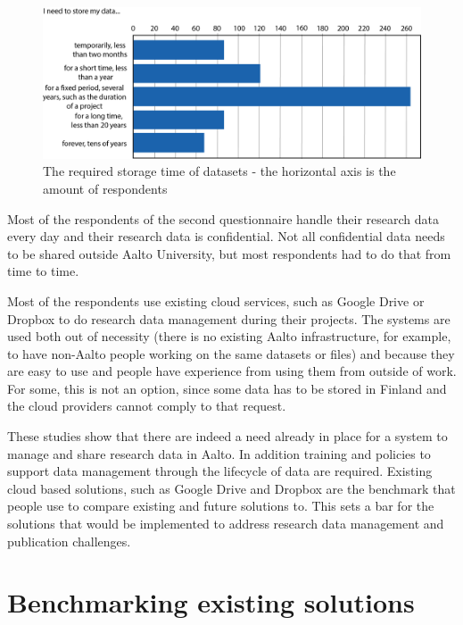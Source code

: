 \begin{figure}
    \begin{centering}
        \includegraphics[width=\textwidth]{images/time}
    \end{centering}
    \caption{The required storage time of datasets - the horizontal axis is the amount
             of respondents}
    \label{fig:time}
\end{figure}

Most of the respondents of the second questionnaire handle their research data
every day and their research data is confidential. Not all confidential data
needs to be shared outside Aalto University, but most respondents had to do
that from time to time.

Most of the respondents use existing cloud services, such as Google Drive or
Dropbox to do research data management during their projects. The systems are
used both out of necessity (there is no existing Aalto infrastructure, for
example, to have non-Aalto people working on the same datasets or files) and
because they are easy to use and people have experience from using them from
outside of work. For some, this is not an option, since some data has to be
stored in Finland and the cloud providers cannot comply to that request.

These studies show that there are indeed a need already in place for a system to
manage and share research data in Aalto. In addition training and policies to support data
management through the lifecycle of data are required. Existing cloud based solutions, such
as Google Drive and Dropbox are the benchmark that people use to compare
existing and future solutions to. This sets a bar for the solutions that
would be implemented to address research data management and publication
challenges.

\section{Benchmarking existing solutions}
\label{sec:benchmarking}

